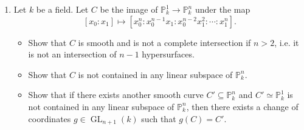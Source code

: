\begin{enumerate}
		\item Let $k$ be a field. Let $C$ be the image of $\mathbb{P}_{k}^{1}\to \mathbb{P}_{k}^{n}$ under the map
		$$
		[x_0:x_1]\mapsto [x^{n}_{0}:x^{n-1}_{0}x_1:x_0^{n-2}x_1^{2}:\cdots: x^{n}_{1}].
		$$
		\begin{itemize}
			\item Show that $C$ is smooth and is not a complete intersection if $n>2$, i.e. it is not an intersection of $n-1$ hypersurfaces.
			\item Show that $C$ is not contained in any linear subspace of $\mathbb{P}_{k}^{n}$.
			\item Show that if there exists another smooth curve $C' \subseteq \mathbb{P}_{k}^{n}$ and $C'\simeq \mathbb{P}_{k}^{1}$ is not contained in any linear subspace of $\mathbb{P}_{k}^{n}$, then there exists a change of coordinates $g \in \operatorname{GL}_{n+1}(k)$ such that $g(C)=C'$.
		\end{itemize}
	\end{enumerate}